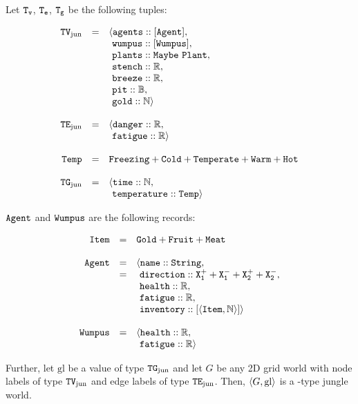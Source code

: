 \begin{definition}[\wjun]
\label{def:wjun}
Let $\mathtt{T_v}$, $\mathtt{T_e}$, $\mathtt{T_g}$ be the following tuples:

$$
	\begin{array}{r c l}
		\type{TV_{\mathrm{jun}}} & = & \langle \field{agents} :: [\type{Agent}],\\
		           &   &       \ \field{wumpus} :: [\type{Wumpus}],\\
		           &   & 	   \ \field{plants} :: \type{Maybe\ Plant},\\
		           &   &       \ \field{stench} :: \R,\\
		           &   &       \ \field{breeze} :: \R,\\
		           &   &	   \ \field{pit}    :: \B,\\
		           &   &	   \ \field{gold}   :: \N \rangle 
		\\
		\\
		\type{TE_{\mathrm{jun}}} & = & \langle \field{danger} :: \R,\\
				   &   &       \ \field{fatigue} :: \R \rangle
		\\
		\\
		\type{Temp} & = & \type{Freezing} + \type{Cold} + \type{Temperate} + \type{Warm} + \type{Hot}\\
		\\
		\type{TG_{\mathrm{jun}}} & = & \langle \field{time} :: \N,\\
				   &   &       \ \field{temperature} :: \type{Temp} \rangle
	\end{array}
$$

$\mathtt{Agent}$ and $\mathtt{Wumpus}$ are the following records:

$$
	\begin{array}{r c l}
		\mathtt{Item} & = & \mathtt{Gold + Fruit + Meat}\\
		\\
		\mathtt{Agent} & = & \langle \mathtt{name} :: \mathtt{String},\\ 
					 & = & \ \mathtt{direction} :: \mathtt{X_1^+ + X_1^- + X_2^+ + X_2^-},\\
					 &   & \ \mathtt{health} :: \mathbb{R},\\
					 &   & \ \mathtt{fatigue} :: \mathbb{R},\\
					 &   & \ \mathtt{inventory} :: [\mathtt{\langle Item, \mathbb{N} \rangle}] \rangle
		\\
		\\
		\mathtt{Wumpus} & = & \langle \mathtt{health} :: \mathbb{R},\\
					  &   & \ \mathtt{fatigue} :: \mathbb{R}\rangle
	\end{array}
$$

Further, let $\mathrm{gl}$ be a value of type $\mathtt{TG}_{\mathrm{jun}}$ and let $G$ be any 2D grid world with node labels of type $\mathtt{TV}_{\mathrm{jun}}$ and edge labels of type $\mathtt{TE}_{\mathrm{jun}}$. Then, $\langle G, \mathrm{gl} \rangle$ is a \wjun-type jungle world.
\end{definition}

